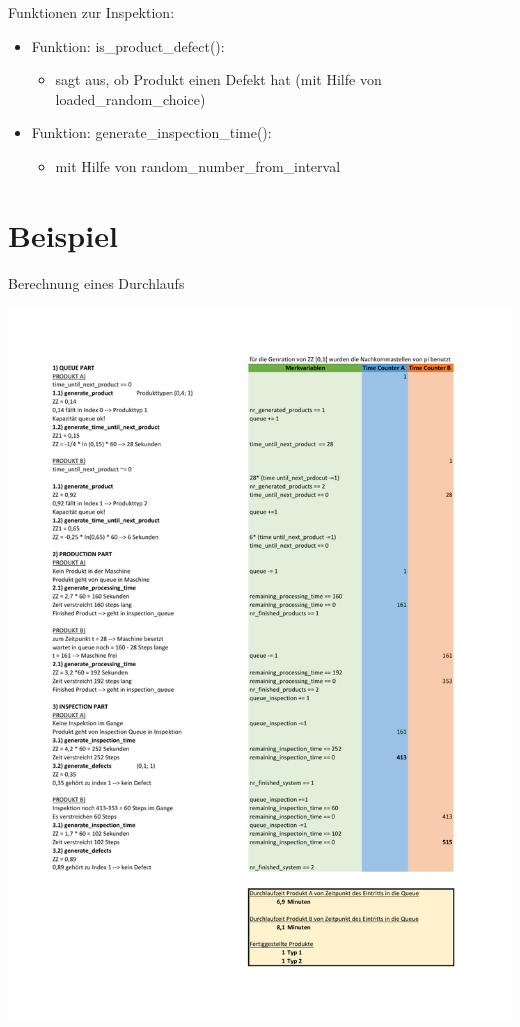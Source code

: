 \begin{frame}[fragile]{Funktionen zur Inspektion:}
  \begin{itemize}
  	\item Funktion: is\_product\_defect():
  	  \begin{itemize}
  		\item sagt aus, ob Produkt einen Defekt hat (mit Hilfe von loaded\_random\_choice)
  	\end{itemize}
  	\vspace{1cm}
  	\item Funktion: generate\_inspection\_time():
  	  \begin{itemize}
		\item mit Hilfe von random\_number\_from\_interval
  	\end{itemize}
  \end{itemize}
\end{frame}	

\section{Beispiel}
\begin{frame}[fragile]{Berechnung eines Durchlaufs}
\begin{center}
	\vspace{-.8cm}
  	\includegraphics[scale=.3]{BSP22_Berrechnung_2Produkte.pdf}
\end{center}
\end{frame}


